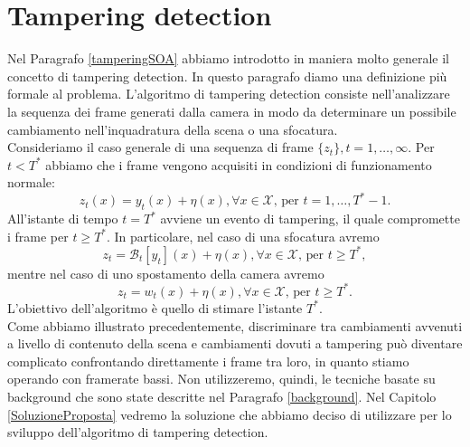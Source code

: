 \section{Tampering detection}
\label{tamperingDef}
Nel Paragrafo \ref{tamperingSOA} abbiamo introdotto in maniera molto generale il concetto di tampering detection. 
In questo paragrafo diamo una definizione pi\`u formale al problema.
L'algoritmo di tampering detection consiste nell'analizzare la sequenza dei frame generati dalla camera in modo da determinare un possibile cambiamento nell'inquadratura della scena o una sfocatura.\\
Consideriamo il caso generale di una sequenza di frame $\{z_t\}, t=1,\dots,\infty$. 
Per $t<T^*$ abbiamo che i frame vengono acquisiti in condizioni di funzionamento normale:
\[ z_t(x)=y_t(x) + \eta(x), \forall x \in \mathcal{X} \mbox{, per } t=1,\dots , T^*-1. \] 
All'istante di tempo $t = T^*$ avviene un evento di tampering, il quale compromette i frame per $t\geq T^*$.  
In particolare, nel caso di una sfocatura avremo
\[ z_t = \mathcal{B}_t[y_t](x) + \eta(x), \forall x \in \mathcal{X} \mbox{, per } t \geq T^*,\]
mentre nel caso di uno spostamento della camera avremo
\[ z_t = w_t(x) + \eta(x), \forall x \in \mathcal{X} \mbox{, per } t \geq T^*. \]
L'obiettivo dell'algoritmo \`e quello di stimare l'istante $T^*$. \\
Come abbiamo illustrato precedentemente, discriminare tra cambiamenti avvenuti a livello di contenuto della scena e cambiamenti dovuti a tampering pu\`o diventare complicato confrontando direttamente i frame tra loro, in quanto stiamo operando con framerate bassi.
Non utilizzeremo, quindi, le tecniche basate su background che sono state descritte nel Paragrafo \ref{background}.
Nel Capitolo \ref{SoluzioneProposta} vedremo la soluzione che abbiamo deciso di utilizzare per lo sviluppo dell'algoritmo di tampering detection. 